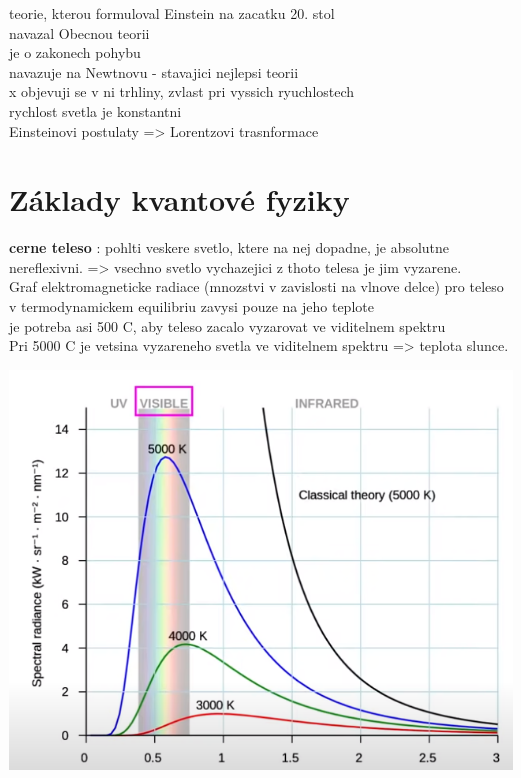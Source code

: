 \documentclass{report}
\begin{document}
\vspace{0.5cm}
teorie, kterou formuloval Einstein na zacatku 20. stol \\
navazal Obecnou teorii \\
je o zakonech pohybu \\
navazuje na Newtnovu - stavajici nejlepsi teorii \\
x objevuji se v ni trhliny, zvlast pri vyssich ryuchlostech \\
rychlost svetla je konstantni \\
Einsteinovi postulaty => Lorentzovi trasnformace \\

\newpage


\section{Základy kvantové fyziky}

\vspace{0.5cm}
\textbf{cerne teleso} : pohlti veskere svetlo, ktere na nej dopadne, je absolutne nereflexivni. => vsechno svetlo vychazejici z thoto telesa je jim vyzarene. \\
Graf elektromagneticke radiace (mnozstvi v zavislosti na vlnove delce) pro teleso v termodynamickem equilibriu zavysi pouze na jeho teplote\\
je potreba asi 500 C, aby teleso zacalo vyzarovat ve viditelnem spektru \\
Pri 5000 C je vetsina vyzareneho svetla ve viditelnem spektru => teplota slunce.

\begin{center}
  \includegraphics[width=0.4\linewidth]{images/spektrum_radiace.png}
\end{center}
\end{document}

